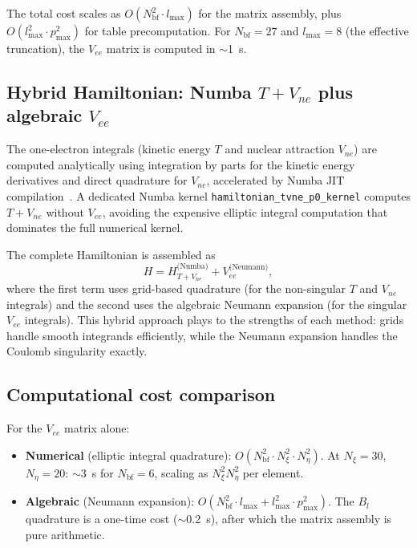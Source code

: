 \documentclass[aps,pra,twocolumn,superscriptaddress,longbibliography]{revtex4-2}
\begin{document}
The total cost scales as $O(N_{\mathrm{bf}}^2 \cdot l_{\max})$
for the matrix assembly, plus $O(l_{\max}^2 \cdot p_{\max}^2)$
for table precomputation.  For $N_{\mathrm{bf}} = 27$ and
$l_{\max} = 8$ (the effective truncation), the $V_{ee}$ matrix
is computed in $\sim$1~s.

\subsection{Hybrid Hamiltonian: Numba \texorpdfstring{$T + V_{ne}$}{T+Vne}
plus algebraic \texorpdfstring{$V_{ee}$}{Vee}}

The one-electron integrals (kinetic energy $T$ and nuclear
attraction $V_{ne}$) are computed analytically using integration
by parts for the kinetic energy derivatives and direct quadrature
for $V_{ne}$, accelerated by Numba JIT
compilation~\cite{Numba2015}.  A dedicated Numba kernel
\texttt{hamiltonian\_tvne\_p0\_kernel} computes $T + V_{ne}$
without $V_{ee}$, avoiding the expensive elliptic integral
computation that dominates the full numerical kernel.

The complete Hamiltonian is assembled as
\begin{equation}
  H = H_{T+V_{ne}}^{\text{(Numba)}} + V_{ee}^{\text{(Neumann)}},
  \label{eq:hybrid_H}
\end{equation}
where the first term uses grid-based quadrature (for the
non-singular $T$ and $V_{ne}$ integrals) and the second
uses the algebraic Neumann expansion (for the singular
$V_{ee}$ integrals).  This hybrid approach plays to the
strengths of each method: grids handle smooth integrands
efficiently, while the Neumann expansion handles the
Coulomb singularity exactly.

\subsection{Computational cost comparison}

For the $V_{ee}$ matrix alone:
\begin{itemize}
  \item \textbf{Numerical} (elliptic integral quadrature):
    $O(N_{\mathrm{bf}}^2 \cdot N_\xi^2 \cdot N_\eta^2)$.
    At $N_\xi = 30$, $N_\eta = 20$: $\sim$3~s for
    $N_{\mathrm{bf}} = 6$, scaling as $N_\xi^2 N_\eta^2$
    per element.
  \item \textbf{Algebraic} (Neumann expansion):
    $O(N_{\mathrm{bf}}^2 \cdot l_{\max} + l_{\max}^2
    \cdot p_{\max}^2)$.  The $B_l$ quadrature is a one-time
    cost ($\sim$0.2~s), after which the matrix assembly
    is pure arithmetic.
\end{itemize}
\end{document}
